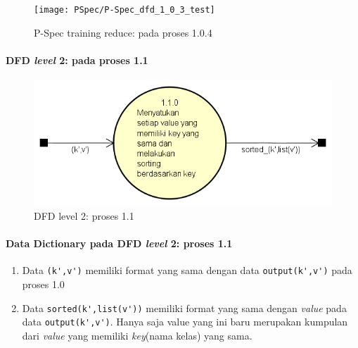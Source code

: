 \begin{figure}[H]
	\centering
	\texttt{[image: PSpec/P-Spec\_dfd\_1\_0\_3\_test]}
	\caption[P-Spec training reduce: pada proses 1.0.4]{P-Spec training reduce: pada proses 1.0.4}
	\label{fig:P-Spec training reduce: pada proses 1.0.4}
\end{figure}


\paragraph{DFD \textit{level} 2: pada proses 1.1}
\begin{figure}[H]
	\centering
	\includegraphics[scale=0.65]{Diagram/DFD_1_2_Training_Test_SS}
	\caption[DFD level 2: proses 1.1]{DFD level 2: proses 1.1}
	\label{fig:DFD level 2: proses 1.1}
\end{figure}

\paragraph{Data Dictionary pada DFD \textit{level} 2: proses 1.1}
\begin{enumerate}
	\item{Data \verb|(k',v')|} memiliki format yang sama dengan data \verb|output(k',v')| pada proses 1.0
	
	\item{Data \verb|sorted(k',list(v'))|} memiliki format yang sama dengan \textit{value} pada data \verb|output(k',v')|. Hanya saja value yang ini baru merupakan kumpulan dari \textit{value} yang memiliki \textit{key}(nama kelas) yang sama.

\end{enumerate}

